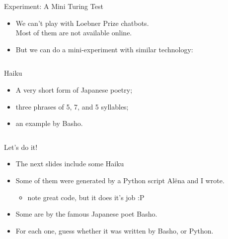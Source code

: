 \documentclass[xcolor={usenames,svgnames,x11names,dvipsnames,table}]{beamer}
\begin{document}
\begin{frame}{Experiment: A Mini Turing Test}
    \begin{itemize}
        \item We can't play with Loebner Prize chatbots.\\
              Most of them are not available online.
        \item But we can do a mini-experiment with similar technology:\\
              \end{itemize}
\pause      
\begin{columns}[T]
    \begin{column}{.4\textwidth}

\begin{block}{Haiku}
\begin{itemize}
\item A very short form of Japanese poetry;
\item three phrases of 5, 7, and 5 syllables;
\item an example by Basho.
\end{itemize}
\end{block}

    \end{column}
    \begin{column}{0.6\textwidth}
   
      
    \begin{quote}
    \end{quote}

    \end{column}
  \end{columns}
\end{frame}

%              
      \begin{frame}{Let's do it!}
                 \begin{itemize}
        \item The next slides include some Haiku
        \item Some of them were generated by a Python script Al{\"e}na and I wrote.
         \begin{itemize}
        \item note great code, but it does it's job :P
        \end{itemize}
        \item Some are by the famous Japanese poet Basho.
        \item For each one, guess whether it was written by Basho, or Python.
    \end{itemize}
\end{frame}
\end{document}

